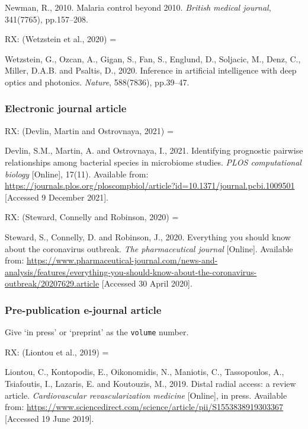 Newman, R., 2010. Malaria control beyond 2010. \emph{British medical journal}, 341(7765), pp.157--208.


RX: (Wetzstein et al., 2020) = \cite{wetzstein.etal2020iai}

Wetzstein, G., Ozcan, A., Gigan, S., Fan, S., Englund, D., Soljacic, M., Denz, C., Miller, D.A.B. and Psaltis, D., 2020. Inference in artificial intelligence with deep optics and photonics. \emph{Nature}, 588(7836), pp.39--47.



\subsubsection*{Electronic journal article}

RX: (Devlin, Martin and Ostrovnaya, 2021) = \cite{devlin.etal2021ipp}

Devlin, S.M., Martin, A. and Ostrovnaya, I., 2021. Identifying prognostic pairwise relationships among bacterial species in microbiome studies. \emph{PLOS computational biology} [Online], 17(11). Available from: \url{https://journals.plos.org/ploscompbiol/article?id=10.1371/journal.pcbi.1009501} [Accessed 9 December 2021].


RX: (Steward, Connelly and Robinson, 2020) = \cite{steward.etal2020eys}

Steward, S., Connelly, D. and Robinson, J., 2020. Everything you should know about the coronavirus outbreak. \emph{The pharmaceutical journal} [Online]. Available from: \url{https://www.pharmaceutical-journal.com/news-and-analysis/features/everything-you-should-know-about-the-coronavirus-outbreak/20207629.article} [Accessed 30 April 2020].



\subsubsection*{Pre-publication e-journal article}

Give `in press' or `preprint' as the \texttt{volume} number.

RX: (Liontou et al., 2019) = \cite{liontou.etal2019dra}

Liontou, C., Kontopodis, E., Oikonomidis, N., Maniotis, C., Tassopoulos, A., Tsiafoutis, I., Lazaris, E. and Koutouzis, M., 2019. Distal radial access: a review article. \emph{Cardiovascular revascularization medicine} [Online], in press. Available from: \url{https://www.sciencedirect.com/science/article/pii/S1553838919303367} [Accessed 19 June 2019].



